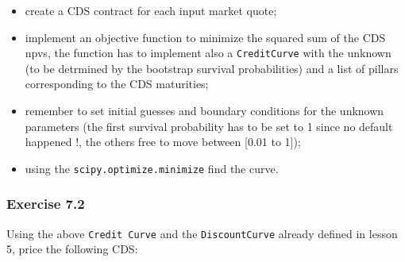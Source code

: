 \documentclass[11pt]{article}
\providecommand{\tightlist}{%
      \setlength{\itemsep}{0pt}\setlength{\parskip}{0pt}}
\begin{document}
\begin{itemize}
\tightlist
\item
  create a CDS contract for each input market quote;
\item
  implement an objective function to minimize the squared sum of the CDS
  npvs, the function has to implement also a \texttt{CreditCurve} with
  the unknown (to be detrmined by the bootstrap survival probabilities)
  and a list of pillars corresponding to the CDS maturities;
\item
  remember to set initial guesses and boundary conditions for the
  unknown parameters (the first survival probability has to be set to 1
  since no default happened !, the others free to move between {[}0.01
  to 1{]});
\item
  using the \texttt{scipy.optimize.minimize} find the curve.
\end{itemize}

    \hypertarget{exercise-7.2}{%
\subsubsection{Exercise 7.2}\label{exercise-7.2}}

Using the above \texttt{Credit\ Curve} and the \texttt{DiscountCurve}
already defined in lesson 5, price the following CDS:
\end{document}
